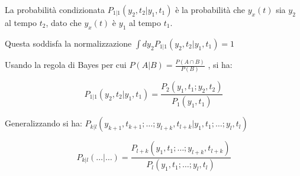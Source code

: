 La probabilità condizionata $P_{1|1}(y_2,t_2|y_1,t_1)$ è  la probabilità che $y_x(t)$ sia $y_2$ al tempo $t_2$, dato che $y_x(t)$ è $y_1$ al tempo $t_1$.

Questa soddisfa la normalizzazione $\int dy_2 P_{1|1}(y_2,t_2|y_1,t_1) = 1$

Usando la regola di Bayes per cui $P(A|B)= \frac{P(A \cap B)}{P(B)}$ , si ha:


\begin{equation}
P_{1|1}(y_2,t_2|y_1,t_1) = \frac{P_2(y_1,t_1;y_2,t_2)}{P_1(y_1,t_1)}
\end{equation}



Generalizzando si ha: $P_{k|l}(y_{k+1},t_{k+1};\dots;y_{l+k},t_{l+k} | y_1,t_1;\dots;y_l,t_l)$ 


\begin{equation}
P_{k|l}(\dots|\dots) = \frac{P_{l+k}(y_1,t_1;\dots;y_{l+k},t_{l+k})}{P_l(y_1,t_1;\dots;y_l,t_l)}
\end{equation}
